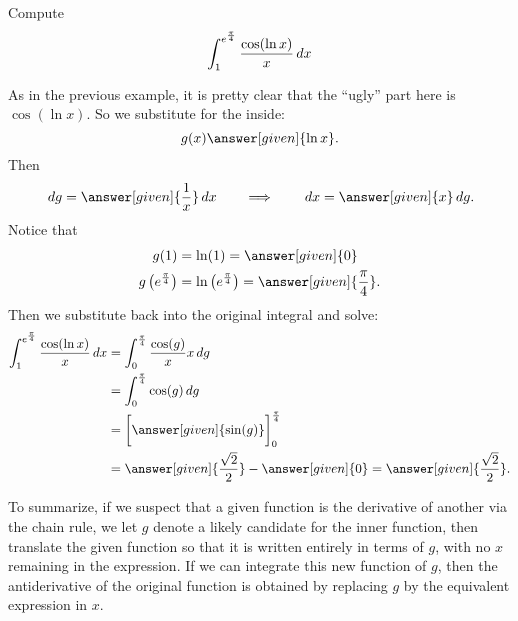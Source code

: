 \documentclass{ximera}
\begin{document}
\begin{example} Compute
\[
\int_{1}^{e^{\frac{\pi}{4}}} \frac{\cos(\ln x)}{x} \,d x
\]
\begin{explanation}
As in the previous example, it is pretty clear that the ``ugly'' part here is $\cos(\ln x)$.  
So we substitute for the inside:
\[
g(x)\answer[given]{\ln x}.
\]
Then
\[
\d g =  \answer[given]{\frac{1}{x}} \d x 	\qquad	\Longrightarrow	\qquad	\d x = \answer[given]{x} \d g.
\]
Notice that
\begin{align*}
g(1) &= \ln (1) = \answer[given]{0} \\
g \left( e^{\frac{\pi}{4}} \right) &= \ln \left( e^{\frac{\pi}{4}} \right) = \answer[given]{\frac{\pi}{4}}.
\end{align*}
Then we substitute back into the original integral and solve:
\begin{align*}
\int_{1}^{e^{\frac{\pi}{4}}} \frac{\cos(\ln x)}{x} \d x &= \int_0^{\frac{\pi}{4}} \frac{\cos(g)}{x} x \d g  \\
&= \int_0^{\frac{\pi}{4}} \cos(g) \d g  \\
&= \eval{\answer[given]{\sin(g)}}_{0}^{\frac{\pi}{4}}  \\
&= \answer[given]{\frac{\sqrt{2}}{2}} - \answer[given]{0} = \answer[given]{\frac{\sqrt{2}}{2}}.
\end{align*}
\end{explanation}
\end{example}

To summarize, if we suspect that a given function is the derivative of
another via the chain rule, we let $g$ denote a likely candidate for
the inner function, then translate the given function so that it is
written entirely in terms of $g$, with no $x$ remaining in the
expression. If we can integrate this new function of $g$, then the
antiderivative of the original function is obtained by replacing $g$
by the equivalent expression in $x$.
\end{document}
